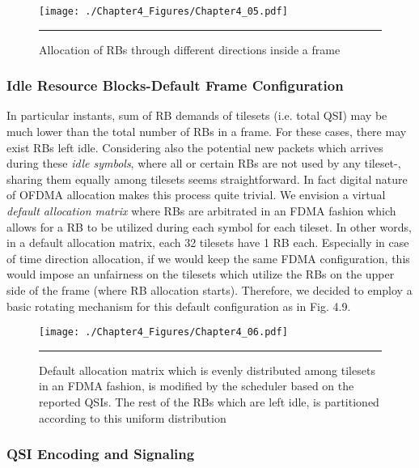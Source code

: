 \begin{figure}[htbp]
  \centering
    \texttt{[image: ./Chapter4\_Figures/Chapter4\_05.pdf]}
    \rule{35em}{0.5pt}
  \caption[Allocation of RBs through different directions inside a frame]{Allocation of RBs through different directions inside a frame} 
  \label{fig:Allocation of RBs through different directions inside a frame}
\end{figure}

\subsubsection{Idle Resource Blocks-Default Frame Configuration}

In particular instants, sum of RB demands of tilesets (i.e. total QSI) may be much lower than the total number of RBs in a frame. For these cases, there may exist RBs left idle. Considering also the potential new packets which arrives during these \textit{idle symbols}, where all or certain RBs are not used by any tileset-, sharing them equally among tilesets seems straightforward. In fact digital nature of OFDMA allocation makes this process quite trivial. We envision a virtual \textit{default allocation matrix} where RBs are arbitrated in an FDMA fashion which allows for a RB to be utilized during each symbol for each tileset. In other words, in a default allocation matrix, each 32 tilesets have 1 RB each. Especially in case of time direction allocation, if we would keep the same FDMA configuration, this would impose an unfairness on the tilesets which utilize the RBs on the upper side of the frame (where RB allocation starts). Therefore, we decided to employ a basic rotating mechanism for this default configuration as in Fig. 4.9.

\begin{figure}[htbp]
  \centering
    \texttt{[image: ./Chapter4\_Figures/Chapter4\_06.pdf]}
    \rule{35em}{0.5pt}
  \caption[Default allocation matrix]{Default allocation matrix which is evenly distributed among tilesets in an FDMA fashion, is modified by the scheduler based on the reported QSIs. The rest of the RBs which are left idle, is partitioned according to this uniform distribution} 
  \label{fig:Default allocation matrix}
\end{figure}

\subsubsection{QSI Encoding and Signaling}

